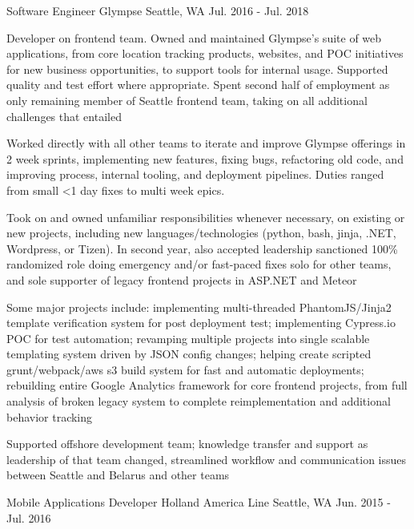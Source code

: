 \begin{cventries}
\cventry
{Software Engineer} %
{Glympse} %
{Seattle, WA} %
{Jul. 2016 - Jul. 2018} %
{
\begin{cvitems}
\item[] {Developer on frontend team. Owned and maintained Glympse's suite of web applications, from core location tracking products, websites, and POC initiatives for new business opportunities, to support tools for internal usage. Supported quality and test effort where appropriate. Spent second half of employment as only remaining member of Seattle frontend team, taking on all additional challenges that entailed}
\item[]
\item {Worked directly with all other teams to iterate and improve Glympse offerings in 2 week sprints, implementing new features, fixing bugs, refactoring old code, and improving process, internal tooling, and deployment pipelines. Duties ranged from small <1 day fixes to multi week epics. }
\item {Took on and owned unfamiliar responsibilities whenever necessary, on existing or new projects, including new languages/technologies (python, bash, jinja, .NET, Wordpress, or Tizen). In second year, also accepted leadership sanctioned 100\% randomized role doing emergency and/or fast-paced fixes solo for other teams, and sole supporter of legacy frontend projects in ASP.NET and Meteor}
\item {Some major projects include: implementing multi-threaded PhantomJS/Jinja2 template verification system for post deployment test; implementing Cypress.io POC for test automation; revamping multiple projects into single scalable templating system driven by JSON config changes; helping create scripted grunt/webpack/aws s3 build system for fast and automatic deployments; rebuilding entire Google Analytics framework for core frontend projects, from full analysis of broken legacy system to complete reimplementation and additional behavior tracking}
\item {Supported offshore development team; knowledge transfer and support as leadership of that team changed, streamlined workflow and communication issues between Seattle and Belarus and other teams}
\end{cvitems}
}

\cventry
{Mobile Applications Developer} %
{Holland America Line} %
{Seattle, WA} %
{Jun. 2015 - Jul. 2016} %
{}


\end{cventries}
